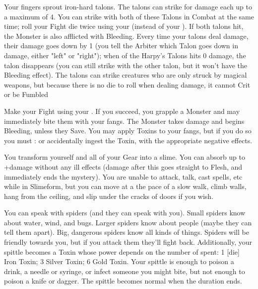 {\MYSTERY [
  Name = Harpy's Talons,
  Link = arcana-mystery-harpys-talons,
  Paradigm = Force,
  Save = n/a,
  Duration = Session,
  Target = Self
]

Your fingers sprout iron-hard talons.  The talons can strike for \DICE damage each up to a maximum of 4.  You can strike with both of these Talons in Combat at the same time; roll your Fight die twice using your \FOC (instead of your \VIG).  If both talons hit, the Monster is also afflicted with Bleeding.  Every time your talons deal damage, their damage goes down by 1 (you tell the Arbiter which Talon goes down in damage, either "left" or "right"); when  of the Harpy's Talons hits 0 damage, the talon disappears (you can still strike with the other talon, but it won't have the Bleeding effect). The talons can strike creatures who are only struck by magical weapons, but because there is no die to roll when dealing damage, it cannot Crit or be Fumbled

\MYSTERY [
  Name = Serpent's Fang,
  Link = arcana-mystery-serpents-fang,
  Paradigm = Biomancy,
  Save = n/a,
  Duration = Combat or \SUM Minutes,
  Target = Self
]

Make your Fight \RO using your \FOC.  If you succeed, you grapple a Monster and may immediately bite them with your fangs.  The Monster takes \DICE damage and begins Bleeding, unless they Save.  You may apply Toxins to your fangs, but if you do so you must \RS : \FOC or accidentally ingest the Toxin, with the appropriate negative effects.

\MYSTERY [
  Name = Slimeform,
  Link = arcana-mystery-slimeform,
  Paradigm = Biomancy,
  Save = n/a,
  Duration = \SUM Minutes,
  Target = Self
]

You transform yourself and all of your Gear into a slime.  You can absorb up to \SUMDICE+\DICE damage without any ill effects (damage after this goes straight to Flesh, and immediately ends the mystery).  You are unable to attack, talk, cast spells, etc while in Slimeform, but you can move at a the pace of a slow walk, climb walls, hang from the ceiling, and slip under the cracks of doors if you wish.

\MYSTERY [
  Name = Spidertongue,
  Link = arcana-mystery-spidertongue,
  Paradigm = Biomancy,
  Save = Y (neg.),
  Duration = Combat or \SUM Minutes,
  Target = Self
]

You can speak with spiders (and they can speak with you).  Small spiders know about water, wind, and bugs.  Larger spiders know about people (maybe they can tell them apart).  Big, dangerous spiders know all kinds of things.  Spiders will be friendly towards you, but if you attack them they'll fight back.  Additionally, your spittle becomes a Toxin whose power depends on the number of \DICE spent: 1 [die] Iron Toxin; 3 \DICE Silver Toxin; 6 \DICE Gold Toxin.  Your spittle is enough to poison a drink, a needle or syringe, or infect someone you might bite, but not enough to poison a knife or dagger.  The spittle becomes normal when the duration ends.


}
